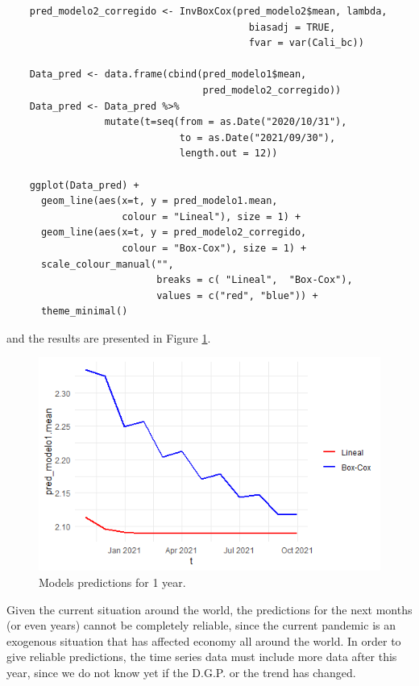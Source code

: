 \documentclass[fleqn]{article}
\begin{document}
\begin{enumerate}
\begin{verbatim}
    pred_modelo2_corregido <- InvBoxCox(pred_modelo2$mean, lambda,
                                          biasadj = TRUE,
                                          fvar = var(Cali_bc))
    
    Data_pred <- data.frame(cbind(pred_modelo1$mean,
                                  pred_modelo2_corregido))
    Data_pred <- Data_pred %>%
                 mutate(t=seq(from = as.Date("2020/10/31"), 
                              to = as.Date("2021/09/30"), 
                              length.out = 12))
    
    ggplot(Data_pred) +
      geom_line(aes(x=t, y = pred_modelo1.mean,
                    colour = "Lineal"), size = 1) +
      geom_line(aes(x=t, y = pred_modelo2_corregido,
                    colour = "Box-Cox"), size = 1) +
      scale_colour_manual("", 
                          breaks = c( "Lineal",  "Box-Cox"),
                          values = c("red", "blue")) +
      theme_minimal()
    \end{verbatim}
    and the results are presented in Figure \ref{fig:preds}.
    
    \begin{figure}[H]
    \centering
    \includegraphics[width=0.75\linewidth]{figs/preds.png}
    \caption{Models predictions for 1 year.}
    \label{fig:preds}
    \end{figure}
    Given the current situation around the world, the predictions for the next months (or even years) cannot be completely reliable, since the current pandemic is an exogenous situation that has affected economy all around the world. In order to give reliable predictions, the time series data must include more data after this year, since we do not know yet if the D.G.P. or the trend has changed.
    
\end{enumerate}
\end{document}
